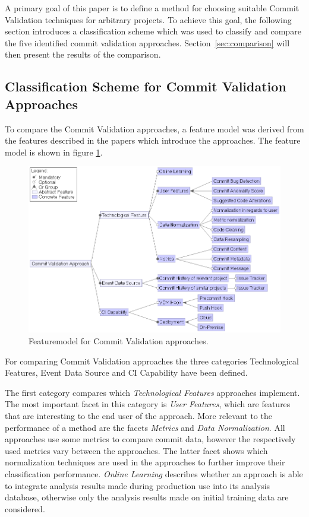 A primary goal of this paper is to define a method for choosing suitable Commit Validation techniques for arbitrary projects. To achieve this goal, the following section introduces a classification scheme which was used to classify and compare the five identified commit validation approaches. Section~\ref{sec:comparison} will then present the results of the comparison.

\subsection{Classification Scheme for Commit Validation Approaches}
\label{sec:scheme}

To compare the Commit Validation approaches, a feature model was derived from the features described in the papers which introduce the approaches. The feature model is shown in figure \ref{fig:featuremodel}.

\begin{figure}[t]
	\centering
	\includegraphics[width=15cm]{images/featuremodel}
	\caption{Featuremodel for Commit Validation approaches.}
	\label{fig:featuremodel}
\end{figure}

For comparing Commit Validation approaches the three categories Technological Features, Event Data Source and CI Capability have been defined.

The first category compares which \textit{Technological Features} approaches implement. The most important facet in this category is \textit{User Features}, which are features that are interesting to the end user of the approach. 
More relevant to the performance of a method are the facets \textit{Metrics} and \textit{Data Normalization}. All approaches use some metrics to compare commit data, however the respectively used metrics vary between the approaches.
The latter facet shows which normalization techniques are used in the approaches to further improve their classification performance.
\textit{Online Learning} describes whether an approach is able to integrate analysis results made during production use into its analysis database, otherwise only the analysis results made on initial training data are considered. 

